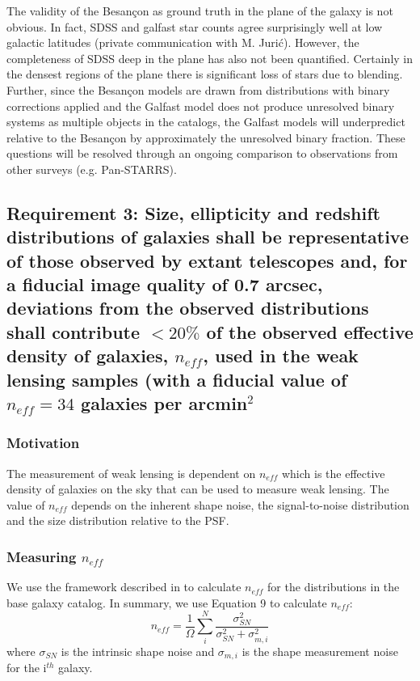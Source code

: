\documentclass[]{article}
\begin{document}
{The validity of the Besan\c{c}on as ground truth in the plane of the galaxy is not obvious.  In fact, SDSS and galfast star counts agree surprisingly well at low galactic latitudes (private communication with M. Juri\'{c}). 
However, the completeness of SDSS deep in the plane has also not been quantified.  Certainly in the densest regions
of the plane there is significant loss of stars due to blending.  Further, since the Besan\c{c}on models are drawn
from distributions with binary corrections applied and the Galfast model does not produce unresolved binary systems
as multiple objects in the catalogs, the Galfast models will underpredict relative to the Besan\c{c}on by 
approximately the unresolved binary fraction.  These questions will be resolved through an ongoing comparison to observations
from other surveys (e.g. Pan-STARRS).

\subsection{Requirement 3: Size, ellipticity and redshift distributions of galaxies shall be representative of those observed by extant
telescopes and, for a fiducial image quality of 0.7 arcsec, deviations from the observed distributions shall
contribute $< 20\%$ of the observed effective density of galaxies, $n_{eff}$, used in the weak lensing samples (with a fiducial value of
$n_{eff} = 34$ galaxies per arcmin$^2$}
\subsubsection{Motivation}
The measurement of weak lensing is dependent 
on $n_{eff}$ which is the effective density of galaxies on the sky that can be used to measure weak lensing.  
The value of $n_{eff}$ depends on the inherent shape noise, the signal-to-noise distribution and the size distribution relative to the PSF.



\subsubsection{Measuring $n_{eff}$}
We use the framework described in \citet{chang} to calculate $n_{eff}$ for the distributions in the 
base galaxy catalog.  In summary, we use Equation 9 to calculate $n_{eff}$:
\begin{equation}
n_{eff} = \frac{1}{\Omega}\sum^N_i\frac{\sigma^2_{SN}}{\sigma^2_{SN}+\sigma^2_{m,i}}
\end{equation}
where $\sigma_{SN}$ is the intrinsic shape noise and $\sigma_{m,i}$ is the shape measurement noise for the i$^{th}$ galaxy.

}
\end{document}
